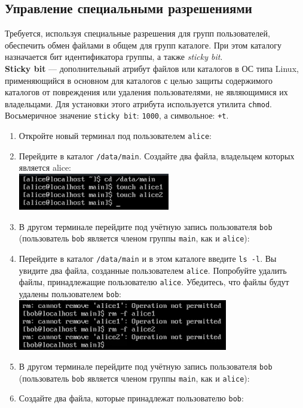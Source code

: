 \documentclass[12pt]{article}
\begin{document}
\subsection{Управление специальными разрешениями}
Требуется, используя специальные разрешения для групп пользователей, обеспечить обмен файлами в общем для групп каталоге. При этом каталогу назначается бит идентификатора группы, а также \textit{sticky bit}.\\
\textbf{Sticky bit} — дополнительный атрибут файлов или каталогов в ОС типа Linux, применяющийся в основном для каталогов с целью защиты содержимого каталогов от повреждения или удаления пользователями, не являющимися их владельцами. Для установки этого атрибута используется утилита \texttt{chmod}. Восьмеричное значение \texttt{sticky bit}: \texttt{1000}, а символьное: \texttt{+t}.
\begin{enumerate}
	\item Откройте новый терминал под пользователем \texttt{alice}:
	\item Перейдите в каталог \texttt{/data/main}. Создайте два файла, владельцем которых является alice:
	      \\\includegraphics{4.png}
	\item В другом терминале перейдите под учётную запись пользователя \texttt{bob} (пользователь \texttt{bob} является членом группы \texttt{main}, как и \texttt{alice}):
	\item Перейдите в каталог \texttt{/data/main} и в этом каталоге введите \texttt{ls -l}. Вы увидите два файла, созданные пользователем \texttt{alice}. Попробуйте удалить файлы, принадлежащие пользователю \texttt{alice}. Убедитесь, что файлы будут удалены пользователем \texttt{bob}:
	      \\\includegraphics{5.png}
	\item В другом терминале перейдите под учётную запись пользователя \texttt{bob} (пользователь \texttt{bob} является членом группы \texttt{main}, как и \texttt{alice}):
	\item Создайте два файла, которые принадлежат пользователю \texttt{bob}:

\end{enumerate}
\end{document}

